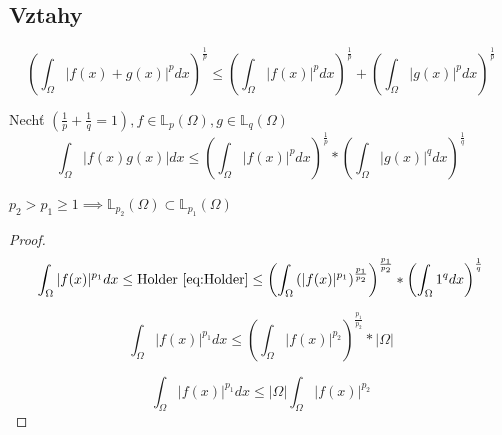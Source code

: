\documentclass[../main.tex]{subfiles}
\begin{document}
\subsection{Vztahy}

\begin{theorem}
    \begin{equation}\label{eq:Mink}
        \left ( \int_\Omega |f(x) + g(x)|^p dx \right ) ^{\frac{1}{p}} \leq \left ( \int_\Omega |f(x)|^p dx \right ) ^{\frac{1}{p}} + \left ( \int_\Omega |g(x)|^p dx \right ) ^{\frac{1}{p}}
    \end{equation}
\end{theorem}


\begin{theorem}
    Nechť $\left (  \frac{1}{p} + \frac{1}{q} = 1 \right ), f \in \mathbb{L}_p(\Omega), g \in \mathbb{L}_q(\Omega)$
    \begin{equation}\label{eq:Holder}
        \int_\Omega \left| f(x)g(x) \right| dx \leq \left ( \int_\Omega |f(x)|^p dx \right ) ^{\frac{1}{p}} * \left ( \int_\Omega |g(x)|^q dx \right ) ^{\frac{1}{q}}
    \end{equation}
\end{theorem}

\begin{theorem}
    


$p_2 > p_1 \geq 1 \implies \mathbb{L}_{p_2}(\Omega) \subset \mathbb{L}_{p_1}(\Omega)$
\end{theorem}


\begin{proof}
    
\begin{equation*}
    \int_\Omega |f(x)|^{p_1}dx \leq \text{Holder \eqref{eq:Holder}} \leq \left ( \int_\Omega \left ( |f(x)|^{p_1}\right )^{\frac{p_1}{p_2}} \right )^\frac{p_1}{p_2} * \left ( \int_\Omega 1 ^q dx \right ) ^ \frac{1}{q}
\end{equation*}

\begin{equation*}
    \int_\Omega |f(x)|^{p_1}dx \leq \left( \int_\Omega |f(x)|^{p_2} \right)^{\frac{p_1}{p_2}} * |\Omega|
\end{equation*}

\begin{equation*}
    \int_\Omega |f(x)|^{p_1}dx \leq |\Omega| \int_\Omega |f(x)|^{p_2}
\end{equation*}
\end{proof}
\end{document}
